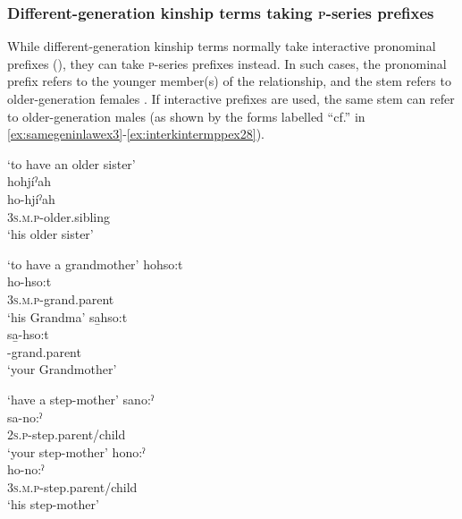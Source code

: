 \subsubsection*{Different-generation kinship terms taking \textsc{p}-series prefixes} \label{ch:Different-generation kinship terms taking o series prefixes}
While different-generation kinship terms normally take interactive pronominal prefixes (), they can take \textsc{p}-series prefixes instead. In such cases, the pronominal prefix refers to the younger member(s) of the relationship, and the stem refers to older-generation females . If interactive prefixes are used, the same stem can refer to older-generation males (as shown by the forms labelled “cf.” in \ref{ex:samegeninlawex3}-\ref{ex:interkintermppex28}). 

\ea\label{ex:samegeninlawex3}  ‘to have an older sister’\\
hohjíˀah\\
\gll ho-hjíˀah\\
\textsc{3s.m.p}-older.sibling\\
\glt `his older sister'
\z


\ea\label{ex:interkintermppex11}  ‘to have a grandmother’
\ea hohso:t\\
\gll ho-hso:t\\
\textsc{3s.m.p}-grand.parent\\
\glt `his Grandma'
\ex sa̱hso:t\\
\gll sa̱-hso:t\\
 -grand.parent\\
\glt `your Grandmother'
\z
\z

\ea\label{ex:interkintermppex28}  ‘have a step-mother’
\ea sano:ˀ\\
\gll sa-no:ˀ\\
 \textsc{2s.p}-step.parent/child\\
\glt `your step-mother'
\ex hono:ˀ\\
\gll ho-no:ˀ\\
\textsc{3s.m.p}-step.parent/child\\
\glt `his step-mother'
\z
\z

